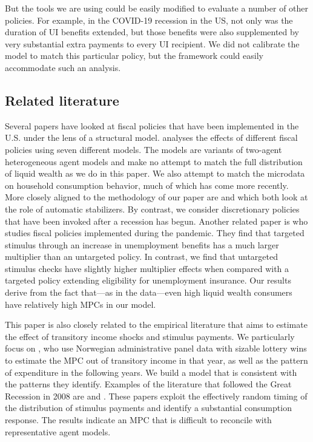 \documentclass[\econtexRoot/HAFiscal]{subfiles}
\begin{document}
But the tools we are using could be easily modified to evaluate a number of other policies.  For example, in the COVID-19 recession in the US, not only was the duration of UI benefits extended, but those benefits were also supplemented by very substantial extra payments to every UI recipient.  We did not calibrate the model to match this particular policy, but the framework could easily accommodate such an analysis.

\hypertarget{related-literature}{}\par\subsection{Related literature}
\notinsubfile{\label{sec:lit}}

Several papers have looked at fiscal policies that have been implemented in the U.S. under the lens of a structural model. \cite{coenen2012effects} analyses the effects of different fiscal policies using seven different models. The models are variants of two-agent heterogeneous agent models and make no attempt to match the full distribution of liquid wealth as we do in this paper. We also attempt to match the microdata on household consumption behavior, much of which has come more recently.  More closely aligned to the methodology of our paper are \cite{mckay2016role} and \cite{mckay2021optimal} which both look at the role of automatic stabilizers. By contrast, we consider discretionary policies that have been invoked after a recession has begun. Another related paper is \cite{bayercoronavirus} who studies fiscal policies implemented during the pandemic. They find that targeted stimulus through an increase in unemployment benefits has a much larger multiplier than an untargeted policy. In contrast, we find that untargeted stimulus checks have slightly higher multiplier effects when compared with a targeted policy extending eligibility for unemployment insurance. Our results derive from the fact that---as in the data---even high liquid wealth consumers have relatively high MPCs in our model.

This paper is also closely related to the empirical literature that aims to estimate the effect of transitory income shocks and stimulus payments. We particularly focus on \cite{fagereng_mpc_2021}, who use Norwegian administrative panel data with sizable lottery wins to estimate the MPC out of transitory income in that year, as well as the pattern of expenditure in the following years. We build a model that is consistent with the patterns they identify. Examples of the literature that followed the Great Recession in 2008 are \cite{parker2013consumer} and \cite{broda2014economic}. These papers exploit the effectively random timing of the distribution of stimulus payments and identify a substantial consumption response. The results indicate an MPC that is difficult to reconcile with representative agent models.
\end{document}
